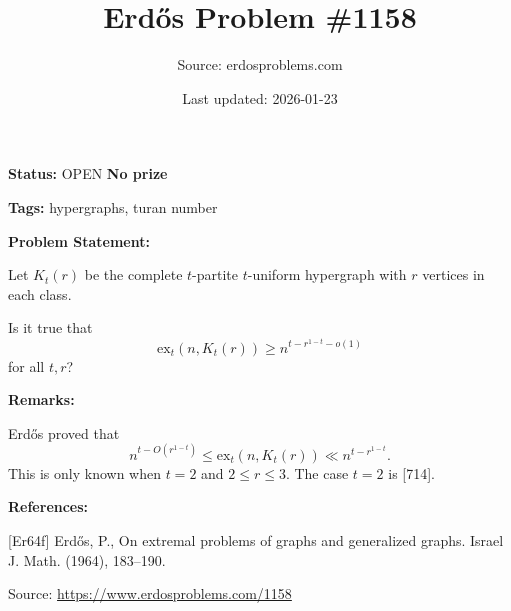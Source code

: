 \documentclass{article}
\title{Erd\H{o}s Problem \#1158}
\date{Last updated: 2026-01-23}
\author{Source: erdosproblems.com}
\begin{document}
\maketitle

\noindent\textbf{Status:} OPEN \quad \textbf{No prize}

\noindent\textbf{Tags:} hypergraphs, turan number

\medskip
\noindent\textbf{Problem Statement:}

Let $K_{t}(r)$ be the complete $t$-partite $t$-uniform hypergraph with $r$ vertices in each class. 

Is it true that\[\mathrm{ex}_t(n,K_t(r)) \geq n^{t-r^{1-t}-o(1)}\]for all $t,r$?

\bigskip
\noindent\textbf{Remarks:}

Erd\H{o}s \cite{Er64f} proved that\[n^{t-O(r^{1-t})}\leq \mathrm{ex}_t(n,K_t(r)) \ll n^{t-r^{1-t}}.\]This is only known when $t=2$ and $2\leq r\leq 3$. The case $t=2$ is [714].

\bigskip
\noindent\textbf{References:}

[Er64f] Erd\H{o}s, P., On extremal problems of graphs and generalized graphs. Israel J. Math. (1964), 183--190.

\bigskip
\noindent\small{Source: \url{https://www.erdosproblems.com/1158}}
\end{document}
